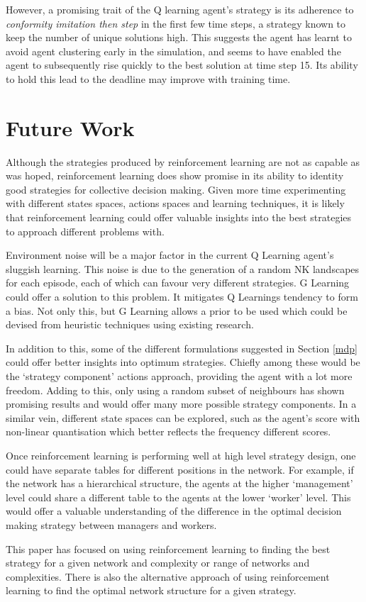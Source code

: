 \documentclass[conference]{IEEEtran}
\begin{document}
However, a promising trait of the Q learning agent's strategy is its
adherence to \emph{conformity imitation then step} in the first few time steps,
a strategy known to keep the number of unique solutions high.
This suggests the agent has learnt to avoid
agent clustering early in the simulation,
and seems to have enabled the agent to subsequently rise quickly
to the best solution at time step 15.
Its ability to hold this lead to the deadline
may improve with training time.




\section{Future Work}
Although the strategies produced by reinforcement learning are
not as capable as was hoped,
reinforcement learning does show promise
in its ability to identity good strategies for collective decision making.
Given more time experimenting with different
states spaces, actions spaces and learning techniques,
it is likely that reinforcement learning could offer valuable insights
into the best strategies to approach different problems with.

Environment noise will be a major factor in
the current Q Learning agent's sluggish learning.
This noise is due to the generation of a random NK landscapes for each episode,
each of which can favour very different strategies.
G Learning \cite{glearning}
could offer a solution to this problem.
It mitigates Q Learnings tendency to form a bias.
Not only this, but G Learning allows a prior to be used
which could be devised from heuristic techniques using existing research.

In addition to this,
some of the different formulations suggested in Section \ref{mdp}
could offer better insights into optimum strategies.
Chiefly among these would be the `strategy component' actions approach,
providing the agent with a lot more freedom.
Adding to this, only using a random subset of neighbours
has shown promising results \cite{sociallearning}
and would offer many more possible strategy components.
In a similar vein, different state spaces can be explored,
such as the agent's score with non-linear quantisation
which better reflects the frequency different scores.


Once reinforcement learning is performing well at high level strategy design,
one could have separate tables for different positions in the network.
For example, if the network has a hierarchical structure,
the agents at the higher `management' level could share a different table
to the agents at the lower `worker' level.
This would offer a valuable understanding of the difference in the
optimal decision making strategy between managers and workers.

This paper has focused on using reinforcement learning
to finding the best strategy
for a given network and complexity or range of networks and complexities.
There is also the alternative approach of using reinforcement learning to
find the optimal network structure for a given strategy.


{}

\end{document}
